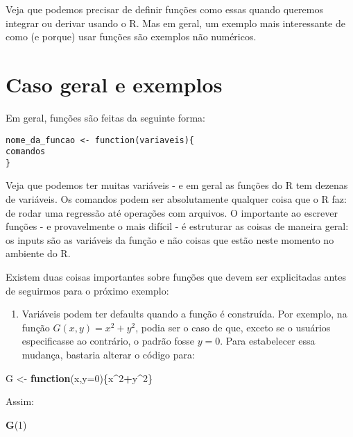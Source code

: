 \documentclass[]{book}
\newenvironment{Shaded}{\begin{snugshade}}{\end{snugshade}}
\newcommand{\KeywordTok}[1]{\textcolor[rgb]{0.13,0.29,0.53}{\textbf{#1}}}
\newcommand{\DataTypeTok}[1]{\textcolor[rgb]{0.13,0.29,0.53}{#1}}
\newcommand{\DecValTok}[1]{\textcolor[rgb]{0.00,0.00,0.81}{#1}}
\newcommand{\StringTok}[1]{\textcolor[rgb]{0.31,0.60,0.02}{#1}}
\newcommand{\ControlFlowTok}[1]{\textcolor[rgb]{0.13,0.29,0.53}{\textbf{#1}}}
\newcommand{\OperatorTok}[1]{\textcolor[rgb]{0.81,0.36,0.00}{\textbf{#1}}}
\newcommand{\NormalTok}[1]{#1}
\providecommand{\tightlist}{%
  \setlength{\itemsep}{0pt}\setlength{\parskip}{0pt}}
\begin{document}
Veja que podemos precisar de definir funções como essas quando queremos
integrar ou derivar usando o R. Mas em geral, um exemplo mais
interessante de como (e porque) usar funções são exemplos não numéricos.

\section{Caso geral e exemplos}\label{caso-geral-e-exemplos}

Em geral, funções são feitas da seguinte forma:

\begin{verbatim}
nome_da_funcao <- function(variaveis){
comandos
}
\end{verbatim}

Veja que podemos ter muitas variáveis - e em geral as funções do R tem
dezenas de variáveis. Os comandos podem ser absolutamente qualquer coisa
que o R faz: de rodar uma regressão até operações com arquivos. O
importante ao escrever funções - e provavelmente o mais difícil - é
estruturar as coisas de maneira geral: os inputs são as variáveis da
função e não coisas que estão neste momento no ambiente do R.

Existem duas coisas importantes sobre funções que devem ser explicitadas
antes de seguirmos para o próximo exemplo:

\begin{enumerate}
\def\labelenumi{(\arabic{enumi})}
\setcounter{enumi}{2}
\tightlist
\item
  Variáveis podem ter defaults quando a função é construída. Por
  exemplo, na função \(G(x,y) = x^2+y^2\), podia ser o caso de que,
  exceto se o usuários especificasse ao contrário, o padrão fosse
  \(y = 0\). Para estabelecer essa mudança, bastaria alterar o código
  para:
\end{enumerate}

\begin{Shaded}
\begin{Highlighting}[]
\NormalTok{G <-}\StringTok{ }\ControlFlowTok{function}\NormalTok{(x,}\DataTypeTok{y=}\DecValTok{0}\NormalTok{)\{x}\OperatorTok{^}\DecValTok{2}\OperatorTok{+}\NormalTok{y}\OperatorTok{^}\DecValTok{2}\NormalTok{\}}
\end{Highlighting}
\end{Shaded}

Assim:

\begin{Shaded}
\begin{Highlighting}[]
\KeywordTok{G}\NormalTok{(}\DecValTok{1}\NormalTok{)}
\end{Highlighting}
\end{Shaded}
\end{document}
